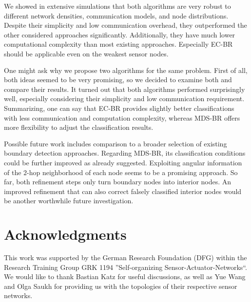 \documentclass{llncs}
\begin{document}
We showed in extensive simulations that both algorithms are very robust to different network densities, communication models, and node distributions.
Despite their simplicity and low communication overhead, they outperformed the other considered approaches significantly.
Additionally, they have much lower computational complexity than most existing approaches.
Especially EC-BR should be applicable even on the weakest sensor nodes.

One might ask why we propose two algorithms for the same problem.
First of all, both ideas seemed to be very promising, so we decided to examine both and compare their results.
It turned out that both algorithms performed surprisingly well, especially considering their simplicity and low communication requirement.
Summarizing, one can say that EC-BR provides slightly better classifications with less communication and computation complexity, whereas MDS-BR offers more flexibility to adjust the classification results.

Possible future work includes comparison to a broader selection of existing boundary detection approaches.
Regarding MDS-BR, its classification conditions could be further improved as already suggested.
Exploiting angular information of the $2$-hop neighborhood of each node seems to be a promising approach.
So far, both refinement steps only turn boundary nodes into interior nodes.
An improved refinement that can also correct falsely classified interior nodes would be another worthwhile future investigation.




\section{Acknowledgments}
This work was supported by the German Research Foundation (DFG) within the Research Training Group GRK 1194 ''Self-organizing Sensor-Actuator-Networks``.
We would like to thank Bastian Katz for useful discussions, as well as Yue Wang and Olga Saukh for providing us with the topologies of their respective sensor networks.





\end{document}

